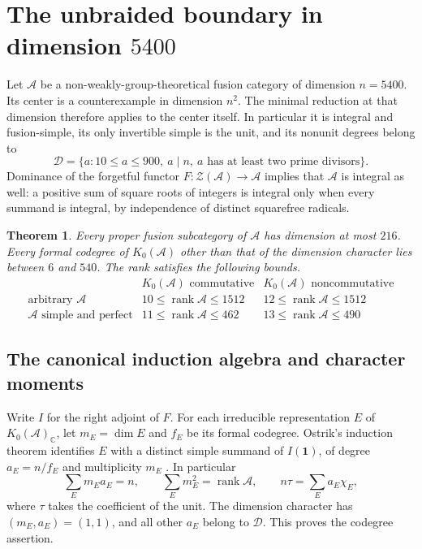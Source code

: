 \documentclass[11pt,a4paper]{article}
\numberwithin{equation}{section}
\newtheorem{theorem}{Theorem}[section]
\theoremstyle{remark}
\newcommand{\Z}{\mathcal Z}
\newcommand{\one}{\mathbf1}
\newcommand{\rank}{\operatorname{rank}}
\newcommand{\CC}{\mathbb C}
\begin{document}
\section{The unbraided boundary in dimension \texorpdfstring{$5400$}{5400}}
\label{sec:unbraided-5400}
Let $\mathcal A$ be a non-weakly-group-theoretical fusion category of
dimension $n=5400$. Its center is a counterexample in dimension $n^2$.
The minimal reduction at that dimension therefore applies to the center
itself. In particular it is integral and fusion-simple, its only
invertible simple is the unit, and its nonunit degrees belong to
\[
 \mathcal D=\{a:10\le a\le900,\ a\mid n,\ a\text{ has at least two prime divisors}\}.
\]
Dominance of the forgetful functor $F:\Z(\mathcal A)\to\mathcal A$
implies that $\mathcal A$ is integral as well: a positive sum of
square roots of integers is integral only when every summand is
integral, by independence of distinct squarefree radicals.

\begin{theorem}\label{th:unbraided-5400}
Every proper fusion subcategory of $\mathcal A$ has dimension at most
$216$. Every formal codegree of $K_0(\mathcal A)$ other than that of
the dimension character lies between $6$ and $540$. The rank satisfies
the following bounds.
\[
\begin{array}{l|cc}
 & K_0(\mathcal A)\text{ commutative}&K_0(\mathcal A)\text{ noncommutative}\\\hline
 \text{arbitrary }\mathcal A&10\le \rank\mathcal A\le1512&12\le \rank\mathcal A\le1512\\
 \mathcal A\text{ simple and perfect}&11\le \rank\mathcal A\le462&13\le \rank\mathcal A\le490
\end{array}
\]
\end{theorem}

\subsection{The canonical induction algebra and character moments}\label{sec:5400-proof}

Write $I$ for the right adjoint of $F$.
For each irreducible representation $E$ of $K_0(\mathcal A)_\CC$,
let $m_E=\dim E$ and $f_E$ be its formal codegree.
Ostrik's induction theorem identifies $E$ with a distinct simple
summand of $I(\one)$, of degree $a_E=n/f_E$ and multiplicity $m_E$
\cite[Theorem~2.13]{OstrikPivotalRankThree}. In particular
\begin{equation}\label{eq:5400-induction}
 \sum_E m_Ea_E=n,\qquad \sum_E m_E^2=\rank\mathcal A,\qquad
 n\tau=\sum_E a_E\chi_E ,
\end{equation}
where $\tau$ takes the coefficient of the unit. The dimension character
has $(m_E,a_E)=(1,1)$, and all other $a_E$ belong to $\mathcal D$.
This proves the codegree assertion.
\end{document}
